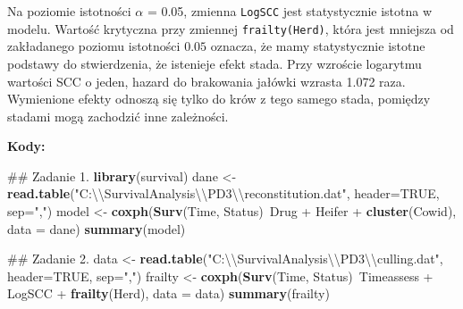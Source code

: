 \documentclass[]{article}
\newenvironment{Shaded}{}{}
\newcommand{\KeywordTok}[1]{\textcolor[rgb]{0.00,0.44,0.13}{\textbf{{#1}}}}
\newcommand{\DataTypeTok}[1]{\textcolor[rgb]{0.56,0.13,0.00}{{#1}}}
\newcommand{\CharTok}[1]{\textcolor[rgb]{0.25,0.44,0.63}{{#1}}}
\newcommand{\StringTok}[1]{\textcolor[rgb]{0.25,0.44,0.63}{{#1}}}
\newcommand{\OtherTok}[1]{\textcolor[rgb]{0.00,0.44,0.13}{{#1}}}
\newcommand{\NormalTok}[1]{{#1}}
\begin{document}
Na poziomie istotności $\alpha$ = 0.05, zmienna \texttt{LogSCC} jest
statystycznie istotna w modelu. Wartość krytyczna przy zmiennej
\texttt{frailty(Herd)}, która jest mniejsza od zakładanego poziomu
istotności $0.05$ oznacza, że mamy statystycznie istotne podstawy do
stwierdzenia, że istenieje efekt stada. Przy wzroście logarytmu wartości
SCC o jeden, hazard do brakowania jałówki wzrasta 1.072 raza. Wymienione
efekty odnoszą się tylko do krów z tego samego stada, pomiędzy stadami
mogą zachodzić inne zależności.

\newpage
\textbf{Kody:}

\begin{Shaded}
\begin{Highlighting}[]
\NormalTok{## Zadanie 1.}
\KeywordTok{library}\NormalTok{(survival)}
\NormalTok{dane <-}\StringTok{ }\KeywordTok{read.table}\NormalTok{(}\StringTok{"C:}\CharTok{\textbackslash{}\textbackslash{}}\StringTok{SurvivalAnalysis}\CharTok{\textbackslash{}\textbackslash{}}\StringTok{PD3}\CharTok{\textbackslash{}\textbackslash{}}\StringTok{reconstitution.dat"}\NormalTok{, }\DataTypeTok{header=}\OtherTok{TRUE}\NormalTok{, }\DataTypeTok{sep=}\StringTok{","}\NormalTok{)}
\NormalTok{model <-}\StringTok{ }\KeywordTok{coxph}\NormalTok{(}\KeywordTok{Surv}\NormalTok{(Time, Status)~Drug +}\StringTok{ }\NormalTok{Heifer +}\StringTok{ }\KeywordTok{cluster}\NormalTok{(Cowid), }\DataTypeTok{data =} \NormalTok{dane) }
\KeywordTok{summary}\NormalTok{(model)}

\NormalTok{## Zadanie 2.}
\NormalTok{data <-}\StringTok{ }\KeywordTok{read.table}\NormalTok{(}\StringTok{"C:}\CharTok{\textbackslash{}\textbackslash{}}\StringTok{SurvivalAnalysis}\CharTok{\textbackslash{}\textbackslash{}}\StringTok{PD3}\CharTok{\textbackslash{}\textbackslash{}}\StringTok{culling.dat"}\NormalTok{, }\DataTypeTok{header=}\OtherTok{TRUE}\NormalTok{, }\DataTypeTok{sep=}\StringTok{","}\NormalTok{)}
\NormalTok{frailty <-}\StringTok{ }\KeywordTok{coxph}\NormalTok{(}\KeywordTok{Surv}\NormalTok{(Time, Status)~Timeassess +}\StringTok{ }\NormalTok{LogSCC +}\StringTok{ }\KeywordTok{frailty}\NormalTok{(Herd), }\DataTypeTok{data =} \NormalTok{data)}
\KeywordTok{summary}\NormalTok{(frailty)}
\end{Highlighting}
\end{Shaded}
\end{document}

